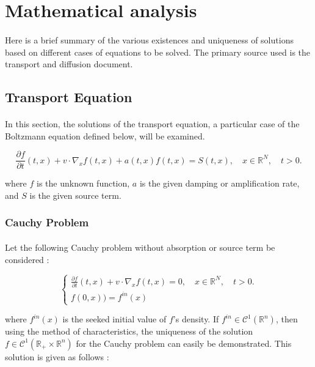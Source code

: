 \documentclass[a4paper, 11pt]{article}
\begin{document}
\section{Mathematical analysis}

\paragraph{} Here is a brief summary of the various existences and uniqueness of solutions based on different cases of equations to be solved. The primary source used is the transport and diffusion document.

\subsection{Transport Equation}

\paragraph{}
In this section, the solutions of the transport equation, a particular case of the Boltzmann equation defined below, will be examined.


\begin{equation} \label{transport}
\frac{\partial f}{\partial t}(t,x)+v \cdot \nabla_x f(t,x) + a(t,x)f(t,x) = S(t,x), \quad x \in \mathbb{R}^N, \quad t>0.
\end{equation}


where $f$ is the unknown function, $a$ is the given damping or amplification rate, and $S$ is the given source term.

\subsubsection{Cauchy Problem}
\paragraph{}

Let the following Cauchy problem without absorption or source term be considered :


\[
\begin{cases}
\frac{\partial f}{\partial t}(t,x)+v \cdot \nabla_x f(t,x)=0, \quad x \in \mathbb{R}^N, \quad t>0.\\
f(0,x)) = f^{in}(x)
\end{cases}
\]

where $f^{in}(x)$ is the seeked initial value of $f$'s density. If $f^{in} \in \mathcal{C}^1(\mathbb{R}^n)$, then using the method of characteristics, the uniqueness of the solution $f \in \mathcal{C}^1(\mathbb{R}_+ \times \mathbb{R}^n)$ for the Cauchy problem can easily be demonstrated. This solution is given as follows :
\end{document}
